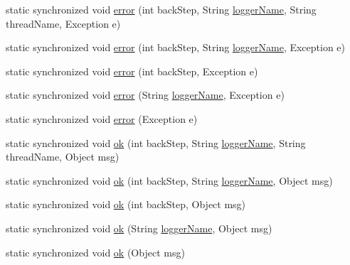 \begin{DoxyCompactItemize}
static synchronized void \hyperlink{classit_1_1emarolab_1_1cagg_1_1debugging_1_1DebuggingText_1_1Logger_a06855010e183d39128e1bfd9764682bf}{error} (int back\-Step, String \hyperlink{classit_1_1emarolab_1_1cagg_1_1debugging_1_1DebuggingText_afa1175bdb0c7a658affe0b25a8a924c3}{logger\-Name}, String thread\-Name, Exception e)
\item 
static synchronized void \hyperlink{classit_1_1emarolab_1_1cagg_1_1debugging_1_1DebuggingText_1_1Logger_aa7d4486332eda9a14932bcf9c9cb3df0}{error} (int back\-Step, String \hyperlink{classit_1_1emarolab_1_1cagg_1_1debugging_1_1DebuggingText_afa1175bdb0c7a658affe0b25a8a924c3}{logger\-Name}, Exception e)
\item 
static synchronized void \hyperlink{classit_1_1emarolab_1_1cagg_1_1debugging_1_1DebuggingText_1_1Logger_a4bc39d843d04d9d843e7b130b7faa487}{error} (int back\-Step, Exception e)
\item 
static synchronized void \hyperlink{classit_1_1emarolab_1_1cagg_1_1debugging_1_1DebuggingText_1_1Logger_a71f49b71e51717ee57bfb4fb331030f8}{error} (String \hyperlink{classit_1_1emarolab_1_1cagg_1_1debugging_1_1DebuggingText_afa1175bdb0c7a658affe0b25a8a924c3}{logger\-Name}, Exception e)
\item 
static synchronized void \hyperlink{classit_1_1emarolab_1_1cagg_1_1debugging_1_1DebuggingText_1_1Logger_a445074f66760d55a4ac50e10c0a2008c}{error} (Exception e)
\item 
static synchronized void \hyperlink{classit_1_1emarolab_1_1cagg_1_1debugging_1_1DebuggingText_1_1Logger_a372b1e101fb784a2ef59ca93588f9178}{ok} (int back\-Step, String \hyperlink{classit_1_1emarolab_1_1cagg_1_1debugging_1_1DebuggingText_afa1175bdb0c7a658affe0b25a8a924c3}{logger\-Name}, String thread\-Name, Object msg)
\item 
static synchronized void \hyperlink{classit_1_1emarolab_1_1cagg_1_1debugging_1_1DebuggingText_1_1Logger_a0db1310394fccfb5d9632aed63c1902b}{ok} (int back\-Step, String \hyperlink{classit_1_1emarolab_1_1cagg_1_1debugging_1_1DebuggingText_afa1175bdb0c7a658affe0b25a8a924c3}{logger\-Name}, Object msg)
\item 
static synchronized void \hyperlink{classit_1_1emarolab_1_1cagg_1_1debugging_1_1DebuggingText_1_1Logger_a09beea48941129958cb091be73f11b51}{ok} (int back\-Step, Object msg)
\item 
static synchronized void \hyperlink{classit_1_1emarolab_1_1cagg_1_1debugging_1_1DebuggingText_1_1Logger_a350bf61147d4ec07b5847b3707ec35c1}{ok} (String \hyperlink{classit_1_1emarolab_1_1cagg_1_1debugging_1_1DebuggingText_afa1175bdb0c7a658affe0b25a8a924c3}{logger\-Name}, Object msg)
\item 
static synchronized void \hyperlink{classit_1_1emarolab_1_1cagg_1_1debugging_1_1DebuggingText_1_1Logger_af097006d7a33fc354001d7fa88c283b4}{ok} (Object msg)
\end{DoxyCompactItemize}


